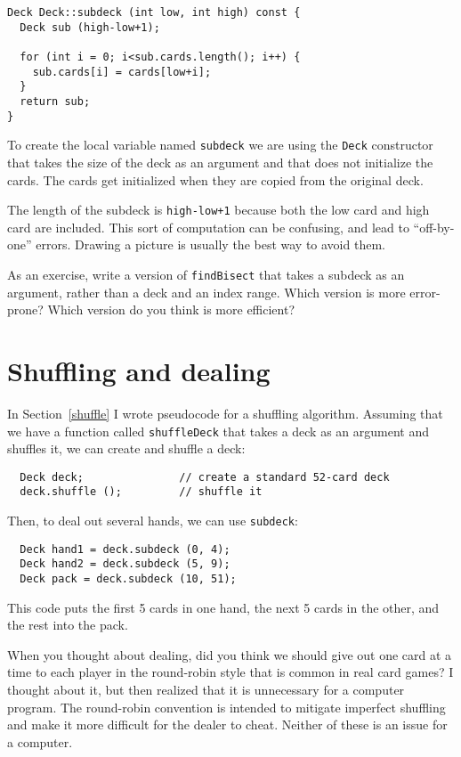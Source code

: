 \begin{verbatim}
Deck Deck::subdeck (int low, int high) const {
  Deck sub (high-low+1);
	
  for (int i = 0; i<sub.cards.length(); i++) {
    sub.cards[i] = cards[low+i];
  }
  return sub;
}
\end{verbatim}
%
To create the local variable named {\tt subdeck} we are using
the {\tt Deck} constructor that takes the size of the deck
as an argument and that does not initialize the cards.  The
cards get initialized when they are copied from the original
deck.

The length of the subdeck is {\tt high-low+1} because both the low
card and high card are included.  This sort of computation can be
confusing, and lead to ``off-by-one'' errors.  Drawing a picture is
usually the best way to avoid them.


As an exercise, write a version of {\tt findBisect} that takes a
subdeck as an argument, rather than a deck and an index range.  Which
version is more error-prone?  Which version do you think is more
efficient?

\section{Shuffling and dealing}

In Section~\ref{shuffle} I wrote pseudocode for a shuffling algorithm.
Assuming that we have a function called {\tt shuffleDeck} that takes
a deck as an argument and shuffles it, we can create and shuffle
a deck:

\begin{verbatim}
  Deck deck;               // create a standard 52-card deck
  deck.shuffle ();         // shuffle it
\end{verbatim}
%
Then, to deal out several hands, we can use {\tt subdeck}:

\begin{verbatim}
  Deck hand1 = deck.subdeck (0, 4);
  Deck hand2 = deck.subdeck (5, 9);
  Deck pack = deck.subdeck (10, 51);
\end{verbatim}
%
This code puts the first 5 cards in one hand, the next 5 cards
in the other, and the rest into the pack.

When you thought about dealing, did you think we should give out one
card at a time to each player in the round-robin style that is common
in real card games?  I thought about it, but then realized that it is
unnecessary for a computer program.  The round-robin convention is
intended to mitigate imperfect shuffling and make it more difficult
for the dealer to cheat.  Neither of these is an issue for a computer.

